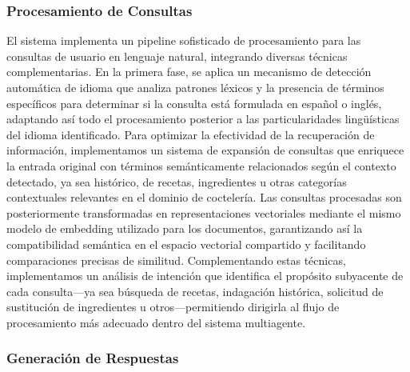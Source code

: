 \documentclass[runningheads]{llncs}
\begin{document}
\subsubsection{Procesamiento de Consultas}

El sistema implementa un pipeline sofisticado de procesamiento para las consultas de usuario en lenguaje natural, integrando diversas técnicas complementarias. En la primera fase, se aplica un mecanismo de detección automática de idioma que analiza patrones léxicos y la presencia de términos específicos para determinar si la consulta está formulada en español o inglés, adaptando así todo el procesamiento posterior a las particularidades lingüísticas del idioma identificado. Para optimizar la efectividad de la recuperación de información, implementamos un sistema de expansión de consultas que enriquece la entrada original con términos semánticamente relacionados según el contexto detectado, ya sea histórico, de recetas, ingredientes u otras categorías contextuales relevantes en el dominio de coctelería. Las consultas procesadas son posteriormente transformadas en representaciones vectoriales mediante el mismo modelo de embedding utilizado para los documentos, garantizando así la compatibilidad semántica en el espacio vectorial compartido y facilitando comparaciones precisas de similitud. Complementando estas técnicas, implementamos un análisis de intención que identifica el propósito subyacente de cada consulta—ya sea búsqueda de recetas, indagación histórica, solicitud de sustitución de ingredientes u otros—permitiendo dirigirla al flujo de procesamiento más adecuado dentro del sistema multiagente.

\subsubsection{Generación de Respuestas}
\end{document}
